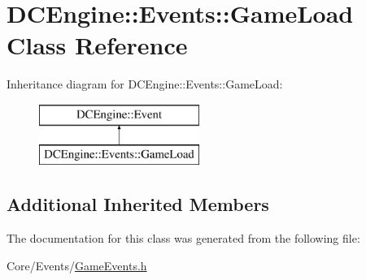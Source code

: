 \hypertarget{classDCEngine_1_1Events_1_1GameLoad}{\section{D\-C\-Engine\-:\-:Events\-:\-:Game\-Load Class Reference}
\label{classDCEngine_1_1Events_1_1GameLoad}
}
Inheritance diagram for D\-C\-Engine\-:\-:Events\-:\-:Game\-Load\-:\begin{figure}[H]
\begin{center}
\leavevmode
\includegraphics[height=2.000000cm]{classDCEngine_1_1Events_1_1GameLoad}
\end{center}
\end{figure}
\subsection*{Additional Inherited Members}


The documentation for this class was generated from the following file\-:\begin{DoxyCompactItemize}
\item 
Core/\-Events/\hyperlink{GameEvents_8h}{Game\-Events.\-h}\end{DoxyCompactItemize}
